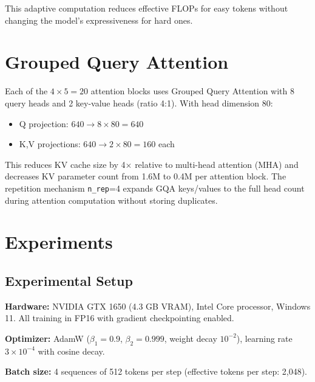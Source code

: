 \documentclass[11pt,a4paper]{article}
\begin{document}
This adaptive computation reduces effective FLOPs for easy tokens without
changing the model's expressiveness for hard ones.

\section{Grouped Query Attention}
\label{sec:gqa}

Each of the $4 \times 5 = 20$ attention blocks uses Grouped Query Attention
\citep{ainslie2023gqa} with 8 query heads and 2 key-value heads (ratio 4:1).
With head dimension 80:

\begin{itemize}
    \item Q projection: $640 \to 8 \times 80 = 640$
    \item K,V projections: $640 \to 2 \times 80 = 160$ each
\end{itemize}

This reduces KV cache size by 4$\times$ relative to multi-head attention
(MHA) and decreases KV parameter count from 1.6M to 0.4M per attention block.
The repetition mechanism \texttt{n\_rep}=4 expands GQA keys/values to the
full head count during attention computation without storing duplicates.

\section{Experiments}
\label{sec:experiments}

\subsection{Experimental Setup}

\textbf{Hardware:} NVIDIA GTX 1650 (4.3 GB VRAM), Intel Core processor,
Windows 11.  All training in FP16 with gradient checkpointing enabled.

\textbf{Optimizer:} AdamW ($\beta_1=0.9$, $\beta_2=0.999$, weight decay
$10^{-2}$), learning rate $3 \times 10^{-4}$ with cosine decay.

\textbf{Batch size:} 4 sequences of 512 tokens per step (effective tokens per
step: 2,048).
\end{document}
